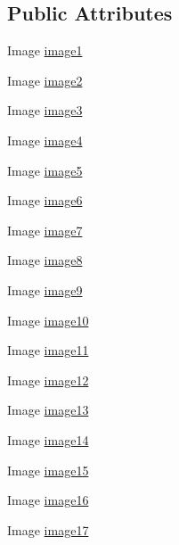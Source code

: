 \subsection*{Public Attributes}
\begin{DoxyCompactItemize}
\item 
Image \mbox{\hyperlink{class_win_con_medium_a82af2f2151310356db41094d3462959d}{image1}}
\item 
Image \mbox{\hyperlink{class_win_con_medium_a246064312a557bf3d219d94087dd4a7c}{image2}}
\item 
Image \mbox{\hyperlink{class_win_con_medium_acd46bfc294703aacc480f38e73d5a9b5}{image3}}
\item 
Image \mbox{\hyperlink{class_win_con_medium_a476c34b9107feaa34b183b8c34aaca62}{image4}}
\item 
Image \mbox{\hyperlink{class_win_con_medium_a729bd8f69a5b1c8e587e69a15cf8e326}{image5}}
\item 
Image \mbox{\hyperlink{class_win_con_medium_af97e5d457da2829765f1c437075c25c0}{image6}}
\item 
Image \mbox{\hyperlink{class_win_con_medium_a553c100528be51cc214553460c9c8582}{image7}}
\item 
Image \mbox{\hyperlink{class_win_con_medium_abcb0b4094b6fc577143db613bef96763}{image8}}
\item 
Image \mbox{\hyperlink{class_win_con_medium_aef132b2d30a26c75dd9203bf8a94dd4d}{image9}}
\item 
Image \mbox{\hyperlink{class_win_con_medium_abb39cbeb938f26064e0d91424ea5e5cd}{image10}}
\item 
Image \mbox{\hyperlink{class_win_con_medium_a1b31433af8b4fd506ed34b75622dc4e6}{image11}}
\item 
Image \mbox{\hyperlink{class_win_con_medium_a1820e4719561520f0985eb0fb63106ec}{image12}}
\item 
Image \mbox{\hyperlink{class_win_con_medium_ae8c1c1ff34a1610bc95a60639b2c7519}{image13}}
\item 
Image \mbox{\hyperlink{class_win_con_medium_a19a0aa17d0d7f22bd0e72242a095a411}{image14}}
\item 
Image \mbox{\hyperlink{class_win_con_medium_a6890efc7c7db76a6b2680d44bd96c49c}{image15}}
\item 
Image \mbox{\hyperlink{class_win_con_medium_ac328a350555467840a6f0e9b324fe4e9}{image16}}
\item 
Image \mbox{\hyperlink{class_win_con_medium_a3b4e1470286575dfe55d58ab69183404}{image17}}
\item 

\end{DoxyCompactItemize}
